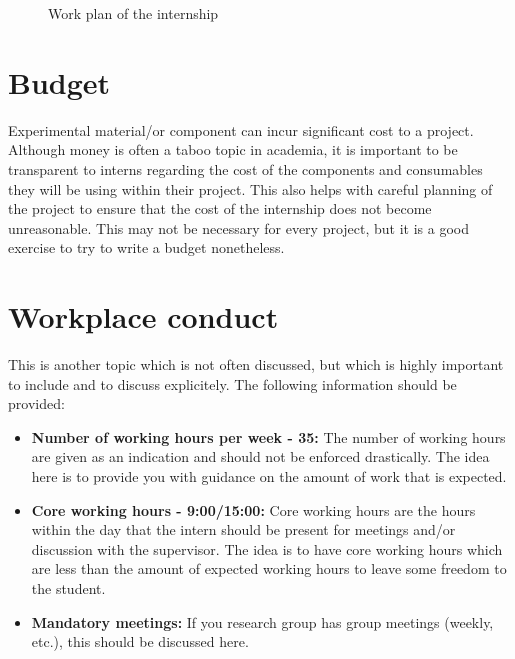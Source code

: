 \documentclass[12pt]{article}
\begin{document}
\begin{figure}[h]
\begin{ganttchart}
  \end{ganttchart}
  \caption{Work plan of the internship
    \vspace{-0.7em}}
    \label{fig:gantt}
    \end{figure}

\section{Budget}

Experimental material/or component can incur significant cost to a project. Although money is often a taboo topic in academia, it is important to be transparent to interns regarding the cost of the components and consumables they will be using within their project. This also helps with careful planning of the project to ensure that the cost of the internship does not become unreasonable. This may not be necessary for every project, but it is a good exercise to try to write a budget nonetheless.


\section{Workplace conduct}

This is another topic which is not often discussed, but which is highly important to include and to discuss explicitely. The following information should be provided:

\begin{itemize}
  \item \textbf{Number of working hours per week - 35: } The number of working hours are given as an indication and should not be enforced drastically. The idea here is to provide you with guidance on the amount of work that is expected.
  \item \textbf{Core working hours - 9:00/15:00: } Core working hours are the hours within the day that the intern should be present for meetings and/or discussion with the supervisor. The idea is to have core working hours which are less than the amount of expected working hours to leave some freedom to the student.
  \item \textbf{Mandatory meetings: } If you research group has group meetings (weekly, etc.), this should be discussed here.
\end{itemize}
\end{document}

